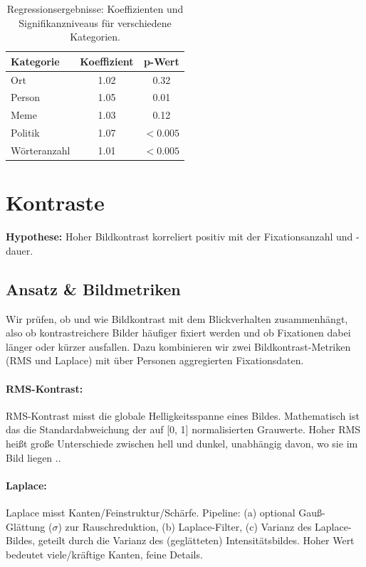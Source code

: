 \documentclass[
    language=german, %
    thesis=seminar, %
    supervisor=postdoc, %
    multiauthor=true, %
    ]{settings/csssa-thesis}
\begin{document}
\begin{table}[htbp]
\centering
\begin{tabular}{lcc}
\hline
\textbf{Kategorie} & \textbf{Koeffizient} & \textbf{p-Wert} \\
\hline
Ort          & 1.02 & 0.32      \\
Person       & 1.05 & 0.01      \\
Meme         & 1.03 & 0.12      \\
Politik      & 1.07 & $<0.005$ \\
Wörteranzahl & 1.01 & $<0.005$ \\
\hline
\end{tabular}
\caption{Regressionsergebnisse: Koeffizienten und Signifikanzniveaus für verschiedene Kategorien.}
\label{tab:kategorien}
\end{table}

\section{Kontraste}

\textbf{Hypothese:} Hoher Bildkontrast korreliert positiv mit der Fixationsanzahl und -dauer. 

\subsection{Ansatz \& Bildmetriken}
Wir prüfen, ob und wie Bildkontrast mit dem Blickverhalten zusammenhängt, 
also ob kontrastreichere Bilder häufiger fixiert werden und ob Fixationen dabei länger oder kürzer ausfallen. 
Dazu kombinieren wir zwei Bildkontrast-Metriken (RMS und Laplace) mit über Personen aggregierten Fixationsdaten.

\paragraph{RMS-Kontrast:} 
RMS-Kontrast misst die globale Helligkeitsspanne eines Bildes. Mathematisch ist das die Standardabweichung der auf [0, 1] normalisierten Grauwerte. 
Hoher RMS heißt große Unterschiede zwischen hell und dunkel, unabhängig davon, wo sie im Bild liegen \cite{Kukkonen1993}.. 

\paragraph{Laplace:}
Laplace misst Kanten/Feinstruktur/Schärfe. Pipeline: (a) optional Gauß-Glättung ($\sigma$) zur Rauschreduktion, (b) Laplace-Filter, (c) Varianz des Laplace-Bildes, 
geteilt durch die Varianz des (geglätteten) Intensitätsbildes. Hoher Wert bedeutet viele/kräftige Kanten, feine Details. 
\end{document}
